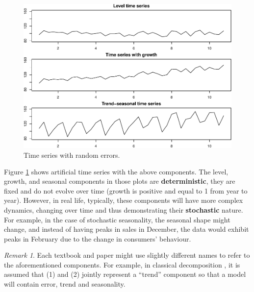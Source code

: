\documentclass[]{book}
\theoremstyle{definition}
\theoremstyle{definition}
\theoremstyle{definition}
\theoremstyle{definition}
\theoremstyle{remark}
\newtheorem*{remark}{Remark}
\begin{document}
\begin{figure}
\centering
\includegraphics{Svetunkov--2022----ADAM_files/figure-latex/allExample-1.pdf}
\caption{\label{fig:allExample}Time series with random errors.}
\end{figure}

Figure \ref{fig:allExample} shows artificial time series with the above components. The level, growth, and seasonal components in those plots are \textbf{deterministic}, they are fixed and do not evolve over time (growth is positive and equal to 1 from year to year). However, in real life, typically, these components will have more complex dynamics, changing over time and thus demonstrating their \textbf{stochastic} nature. For example, in the case of stochastic seasonality, the seasonal shape might change, and instead of having peaks in sales in December, the data would exhibit peaks in February due to the change in consumers' behaviour.

\begin{remark}
Each textbook and paper might use slightly different names to refer to the aforementioned components. For example, in classical decomposition \citep{Persons1919}, it is assumed that (1) and (2) jointly represent a ``trend'' component so that a model will contain error, trend and seasonality.
\end{remark}
\end{document}
